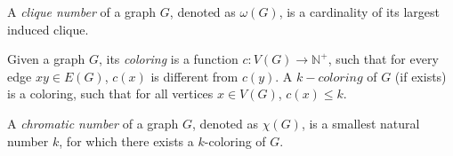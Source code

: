 \begin{defn}
  A \emph{clique number} of a graph $G$, denoted as $\omega(G)$, is a cardinality of its largest induced clique.
\end{defn}

\begin{defn}[coloring]
  Given a graph $G$, its \emph{coloring} is a function $c: V(G) \rightarrow \mathbb{N}^+$, such that for every edge $xy \in E(G)$, $c(x)$ is different from $c(y)$. A $k-coloring$ of $G$ (if exists) is a coloring, such that for all vertices $x \in V(G)$, $c(x) \leq k$.
\end{defn}

\begin{defn}
  A \emph{chromatic number} of a graph $G$, denoted as $\chi(G)$, is a smallest natural number $k$, for which there exists a $k$-coloring of $G$.
\end{defn}

